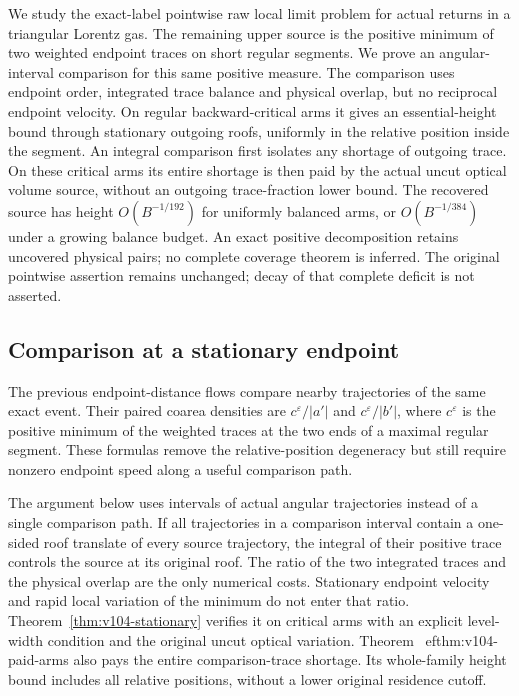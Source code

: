\documentclass[11pt,reqno]{amsart}
\numberwithin{equation}{section}
\theoremstyle{definition}\newtheorem{definition}[theorem]{Definition}
\theoremstyle{remark}\newtheorem{remark}[theorem]{Remark}
\theoremstyle{definition}\newtheorem{inputstatement}[theorem]{Input statement}
\begin{document}
We study the exact-label pointwise raw local limit problem for actual
returns in a triangular Lorentz gas. The remaining upper source is
the positive minimum of two weighted endpoint traces on short regular
segments. We prove an angular-interval comparison for this same
positive measure. The comparison uses endpoint order, integrated
trace balance and physical overlap, but no reciprocal endpoint
velocity. On regular backward-critical arms it gives an essential-height
bound through stationary outgoing roofs, uniformly in the relative
position inside the segment. An integral comparison first isolates
any shortage of outgoing trace. On these critical arms its entire
shortage is then paid by the actual uncut optical volume source,
without an outgoing trace-fraction lower bound. The recovered source has height $O(B^{-1/192})$
for uniformly balanced arms, or $O(B^{-1/384})$ under a growing balance
budget. An exact positive decomposition retains uncovered physical pairs;
no complete coverage theorem is inferred. The original pointwise assertion remains
unchanged; decay of that complete deficit is not asserted.




\subsection{Comparison at a stationary endpoint}
The previous endpoint-distance flows compare nearby trajectories of
the same exact event. Their paired coarea densities are
$c^\varepsilon/|a'|$ and $c^\varepsilon/|b'|$, where
$c^\varepsilon$ is the positive minimum of the weighted traces at
the two ends of a maximal regular segment. These formulas remove
the relative-position degeneracy but still require nonzero endpoint
speed along a useful comparison path.

The argument below uses intervals of actual angular trajectories
instead of a single comparison path. If all trajectories in a
comparison interval contain a one-sided roof translate of every
source trajectory, the integral of their positive trace controls the
source at its original roof. The ratio of the two integrated traces
and the physical overlap are the only numerical costs. Stationary
endpoint velocity and rapid local variation of the minimum do not
enter that ratio. Theorem~\ref{thm:v104-stationary} verifies it on
critical arms with an explicit level-width condition and the original uncut optical variation. Theorem~
ef{thm:v104-paid-arms}
also pays the entire comparison-trace shortage. Its whole-family
height bound includes all
relative positions, without a lower original residence cutoff.
\end{document}
